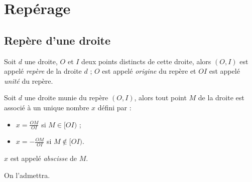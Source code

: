 \chapter{Rep\'erage} \label{reperes}
\minitoc

\fancyhead{}
\fancyfoot{} %
\fancyhead[LE,RO]{\footnotesize \em \rightmark}
    \fancyfoot[LE,RO]{\textbf{\thepage}}


\section{Rep\`ere d'une droite}

\begin{definition}
 Soit $d$ une droite, $O$ et $I$ deux points distincts de cette droite, alors $(O,I)$ est appel\'e \emph{rep\`ere} de la droite $d$ ; $O$ est appel\'e \emph{origine} du rep\`ere et $OI$ est appel\'e \emph{unit\'e} du rep\`ere.
\end{definition}



\begin{prop}
 Soit $d$ une droite munie du rep\`ere $(O,I)$, alors tout point $M$ de la droite est associ\'e \`a un unique nombre $x$ d\'efini par :
\vspace{-1em}\begin{multicols}{2}\begin{itemize}
 \item $x=\frac{OM}{OI}$ si $M\in[OI)$ ;
 \item $x=-\frac{OM}{OI}$ si $M\notin[OI)$.
\end{itemize}\end{multicols}%
$x$ est appel\'e \emph{abscisse} de $M$.
\end{prop}

\noindent On l'admettra.

